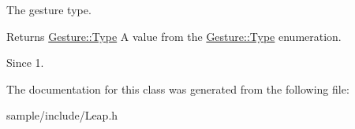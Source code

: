 The gesture type.


\begin{DoxyCodeInclude}
\end{DoxyCodeInclude}


\begin{DoxyReturn}{Returns}
\hyperlink{class_leap_1_1_gesture_a6fa6dd4f28c502f0d55abc6b71c6f9b1}{Gesture\+::\+Type} A value from the \hyperlink{class_leap_1_1_gesture_a6fa6dd4f28c502f0d55abc6b71c6f9b1}{Gesture\+::\+Type} enumeration. 
\end{DoxyReturn}
\begin{DoxySince}{Since}
1. 
\end{DoxySince}


The documentation for this class was generated from the following file\+:\begin{DoxyCompactItemize}
\item 
sample/include/Leap.\+h\end{DoxyCompactItemize}
